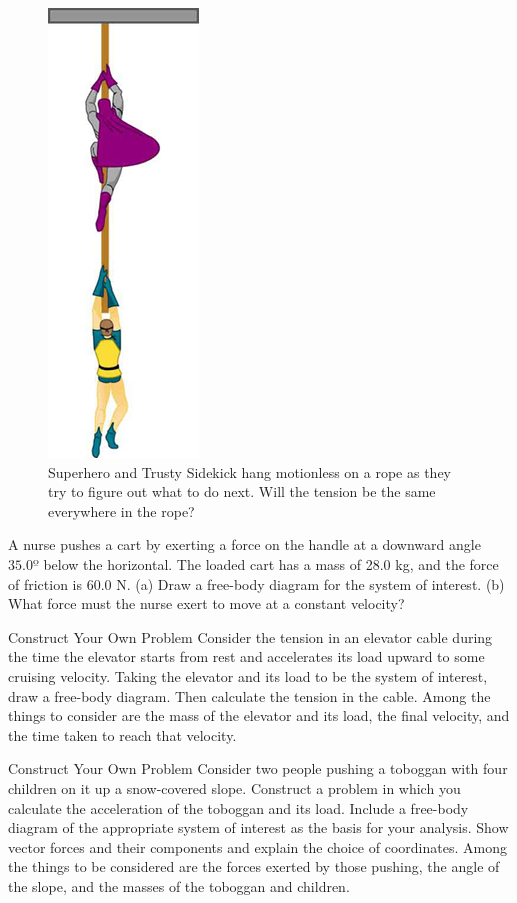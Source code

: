 \documentclass[
]{book}
\begin{document}
\begin{figure}
\hypertarget{import-auto-id1655793}{%
\centering
\includegraphics{images/Figure_04_06_08.jpg}
\caption{Superhero and Trusty Sidekick hang motionless on a rope as they try to
figure out what to do next. Will the tension be the same everywhere in
the rope?}\label{import-auto-id1655793}
}
\end{figure}

\hypertarget{fs-id1552077}{}
\leavevmode{}%
A nurse pushes a cart by exerting a force on the handle at a downward
angle \(\text{35.0º}{}\) below the horizontal. The loaded cart has a mass
of 28.0 kg, and the force of friction is 60.0 N. (a) Draw a free-body
diagram for the system of interest. (b) What force must the nurse exert
to move at a constant velocity?

\hypertarget{fs-id2654456}{}
\hypertarget{fs-id1238679}{}
{Construct Your Own Problem} Consider the tension in
an elevator cable during the time the elevator starts from rest and
accelerates its load upward to some cruising velocity. Taking the
elevator and its load to be the system of interest, draw a free-body
diagram. Then calculate the tension in the cable. Among the things to
consider are the mass of the elevator and its load, the final velocity,
and the time taken to reach that velocity.

\hypertarget{fs-id1677950}{}
\hypertarget{fs-id2341166}{}
{Construct Your Own Problem} Consider two people
pushing a toboggan with four children on it up a snow-covered slope.
Construct a problem in which you calculate the acceleration of the
toboggan and its load. Include a free-body diagram of the appropriate
system of interest as the basis for your analysis. Show vector forces
and their components and explain the choice of coordinates. Among the
things to be considered are the forces exerted by those pushing, the
angle of the slope, and the masses of the toboggan and children.
\end{document}
